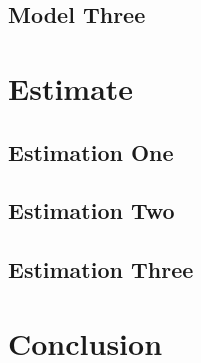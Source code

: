 \documentclass[12pt,english]{article}
\begin{document}
\subsection{Model Three}


\section{Estimate}
\subsection{Estimation One}

\subsection{Estimation Two}

\subsection{Estimation Three}



\section{Conclusion}



\pagebreak

\pagebreak

\appendix
\end{document}
